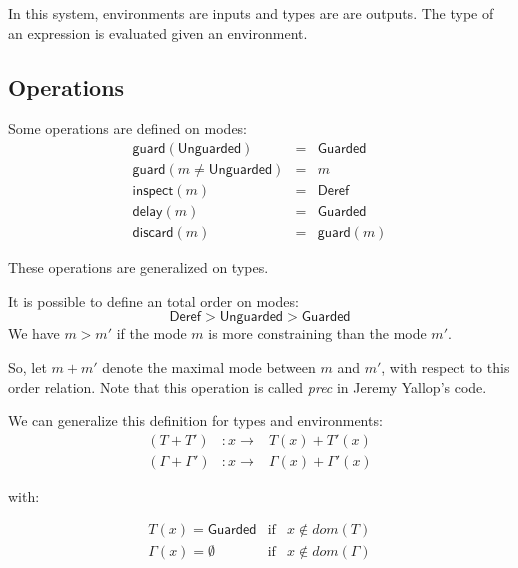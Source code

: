 \documentclass{article}
\newcommand{\Deref}{\mathsf{Deref}}
\newcommand{\Unguarded}{\mathsf{Unguarded}}
\newcommand{\Guarded}{\mathsf{Guarded}}
\newcommand{\inspect}{\mathsf{inspect}}
\newcommand{\guard}{\mathsf{guard}}
\newcommand{\discard}{\mathsf{discard}}
\newcommand{\delay}{\mathsf{delay}}
\begin{document}
In this system, environments are inputs and types are are outputs. The type of
an expression is evaluated given an environment.

\subsection{Operations}
Some operations are defined on modes:
\begin{displaymath}
  \begin{array}{lll}
    \guard(\Unguarded)              & = & \Guarded \\
    \guard(m \neq \Unguarded)       & = & m        \\
    \inspect(m)                     & = & \Deref   \\
    \delay(m)                       & = & \Guarded \\
    \discard(m)                     & = & \guard(m)
  \end{array}
\end{displaymath}

These operations are generalized on types.


It is possible to define an total order on modes:
$$\Deref > \Unguarded > \Guarded$$
We have $m > m'$ if the mode $m$ is more constraining than the mode $m'$.

So, let $m + m'$ denote the maximal mode between $m$ and $m'$, with respect to
this order relation. Note that this operation is called \textit{prec} in
Jeremy Yallop's code.

We can generalize this definition for types and environments:
\begin{displaymath}
  \begin{array}{lll}
    (T + T')           & : x \rightarrow & T(x) + T'(x) \\
    (\Gamma + \Gamma') & : x \rightarrow & \Gamma(x) + \Gamma'(x)
  \end{array}
\end{displaymath}

with:

\begin{displaymath}
  \begin{array}{lll}
    T(x) = \Guarded       & \text{if} & x \notin dom(T) \\
    \Gamma(x) = \emptyset & \text{if} & x \notin dom(\Gamma)
  \end{array}
\end{displaymath}
\end{document}

